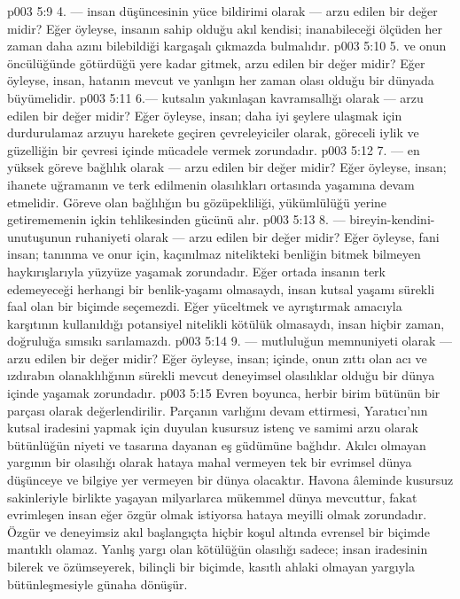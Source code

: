\vs p003 5:9 4.\bibnobreakspace {} --- insan düşüncesinin yüce bildirimi olarak --- arzu edilen bir değer midir? Eğer öyleyse, insanın sahip olduğu akıl kendisi; inanabileceği ölçüden her zaman daha azını bilebildiği kargaşalı çıkmazda bulmalıdır.
\vs p003 5:10 5. ve onun öncülüğünde götürdüğü yere kadar gitmek, arzu edilen bir değer midir? Eğer öyleyse, insan, hatanın mevcut ve yanlışın her zaman olası olduğu bir dünyada büyümelidir.
\vs p003 5:11 6.\bibnobreakspace {}--- kutsalın yakınlaşan kavramsallığı olarak --- arzu edilen bir değer midir? Eğer öyleyse, insan; daha iyi şeylere ulaşmak için durdurulamaz arzuyu harekete geçiren çevreleyiciler olarak, göreceli iylik ve güzelliğin bir çevresi içinde mücadele vermek zorundadır.
\vs p003 5:12 7.\bibnobreakspace {} --- en yüksek göreve bağlılık olarak --- arzu edilen bir değer midir? Eğer öyleyse, insan; ihanete uğramanın ve terk edilmenin olasılıkları ortasında yaşamına devam etmelidir. Göreve olan bağlılığın bu gözüpekliliği, yükümlülüğü yerine getirememenin içkin tehlikesinden gücünü alır.
\vs p003 5:13 8.\bibnobreakspace {} --- bireyin\hyp{}kendini\hyp{}unutuşunun ruhaniyeti olarak --- arzu edilen bir değer midir? Eğer öyleyse, fani insan; tanınma ve onur için, kaçınılmaz nitelikteki benliğin bitmek bilmeyen haykırışlarıyla yüzyüze yaşamak zorundadır. Eğer ortada insanın terk edemeyeceği herhangi bir benlik\hyp{}yaşamı olmasaydı, insan kutsal yaşamı sürekli faal olan bir biçimde seçemezdi. Eğer yüceltmek ve ayrıştırmak amacıyla karşıtının kullanıldığı potansiyel nitelikli kötülük olmasaydı, insan hiçbir zaman, doğruluğa sımsıkı sarılamazdı.
\vs p003 5:14 9.\bibnobreakspace {} --- mutluluğun memnuniyeti olarak --- arzu edilen bir değer midir? Eğer öyleyse, insan; içinde, onun zıttı olan acı ve ızdırabın olanaklılığının sürekli mevcut deneyimsel olasılıklar olduğu bir dünya içinde yaşamak zorundadır.
\vs p003 5:15 Evren boyunca, herbir birim bütünün bir parçası olarak değerlendirilir. Parçanın varlığını devam ettirmesi, Yaratıcı’nın kutsal iradesini yapmak için duyulan kusursuz istenç ve samimi arzu olarak bütünlüğün niyeti ve tasarına dayanan eş güdümüne bağlıdır. Akılcı olmayan yargının bir olasılığı olarak hataya mahal vermeyen tek bir evrimsel dünya  düşünceye ve bilgiye yer vermeyen bir dünya olacaktır. Havona âleminde kusursuz sakinleriyle birlikte yaşayan milyarlarca mükemmel dünya mevcuttur, fakat evrimleşen insan eğer özgür olmak istiyorsa hataya meyilli olmak zorundadır. Özgür ve deneyimsiz akıl başlangıçta hiçbir koşul altında evrensel bir biçimde mantıklı olamaz. Yanlış yargı olan kötülüğün olasılığı sadece; insan iradesinin bilerek ve özümseyerek, bilinçli bir biçimde, kasıtlı ahlaki olmayan yargıyla bütünleşmesiyle günaha dönüşür.
